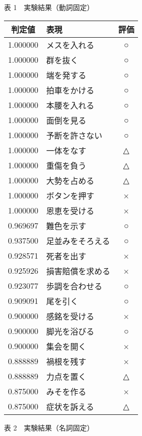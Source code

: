 \begin{minipage}{70mm}
\begin{center}
\bigskip

{\gt 表 1}\ \ 実験結果（動詞固定）
  \end{center}
\end{minipage} \begin{minipage}{70mm}
\vspace{5mm}
\small
  \begin{center}
    \begin{tabular}{|c|l|c|} \hline
判定値 &  表現  & 評価 \\  \hline \hline
1.000000   &  メスを入れる  & ○ \\ \hline
1.000000   &  群を抜く  & ○ \\ \hline
1.000000   &  端を発する  & ○ \\ \hline
1.000000   &  拍車をかける  & ○ \\ \hline
1.000000   &  本腰を入れる  & ○ \\ \hline
1.000000   &  面倒を見る  & ○ \\ \hline
1.000000   &  予断を許さない  & ○ \\ \hline
1.000000   &  一体をなす  & △ \\ \hline
1.000000   &  重傷を負う  & △ \\ \hline
1.000000   &  大勢を占める  & △ \\ \hline
1.000000   &  ボタンを押す & × \\ \hline
1.000000   &  恩恵を受ける  & × \\ \hline
0.969697   &  難色を示す  & ○ \\ \hline
0.937500   &  足並みをそろえる  & ○ \\ \hline
0.928571   &  死者を出す  & × \\ \hline
0.925926   &  損害賠償を求める  & × \\ \hline
0.923077   &  歩調を合わせる  & ○ \\ \hline
0.909091   &  尾を引く  & ○ \\ \hline
0.900000   &  感銘を受ける  & × \\ \hline
0.900000   &  脚光を浴びる  & ○ \\ \hline
0.900000   &  集会を開く  & × \\ \hline
0.888889   &  禍根を残す  & × \\ \hline
0.888889   &  力点を置く  & △ \\ \hline
0.875000   &  みそを作る  & × \\ \hline
0.875000   &  症状を訴える  & △ \\ \hline
    \end{tabular}

\bigskip

{\gt 表 2}\ \ 実験結果（名詞固定）
  \end{center}
\end{minipage}
\normalsize

